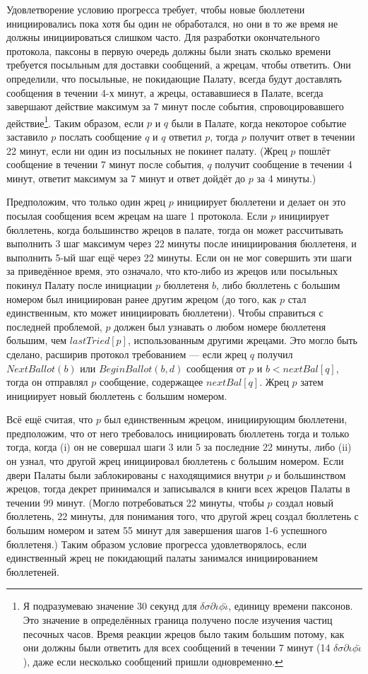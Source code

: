 \documentclass[12pt, a4paper]{article} %
\begin{document}
Удовлетворение условию прогресса требует, чтобы новые бюллетени инициировались пока хотя бы один не обработался, но они в то же время не должны инициироваться слишком часто. Для разработки окончательного протокола, паксоны в первую очередь должны были знать сколько времени требуется посыльным для доставки сообщений, а жрецам, чтобы ответить. Они определили, что посыльные, не покидающие Палату, всегда будут доставлять сообщения в течении 4-х минут, а жрецы, остававшиеся в Палате, всегда завершают действие максимум за 7 минут после события, спровоцировавшего действие\footnote{Я подразумеваю значение 30 секунд для $\delta\sigma\partial\iota\phi\check{\iota}$, единицу времени паксонов. Это значение в определённых граница получено после изучения частиц песочных часов. Время реакции жрецов было таким большим потому, как они должны были ответить для всех сообщений в течении 7 минут (14 $\delta\sigma\partial\iota\phi\check{\iota}$), даже если несколько сообщений пришли одновременно.}. Таким образом, если $p$ и $q$ были в Палате, когда некоторое событие заставило $p$ послать сообщение $q$ и $q$ ответил $p$, тогда $p$ получит ответ в течении 22 минут, если ни один из посыльных не покинет палату. (Жрец $p$ пошлёт сообщение в течении 7 минут после события, $q$ получит сообщение в течении 4 минут, ответит максимум за 7 минут и ответ дойдёт до $p$ за 4 минуты.)

Предположим, что только один жрец $p$ инициирует бюллетени и делает он это посылая сообщения всем жрецам на шаге 1 протокола. Если $p$ инициирует бюллетень, когда большинство жрецов в палате, тогда он может рассчитывать выполнить 3 шаг максимум через 22 минуты после инициирования бюллетеня, и выполнить 5-ый шаг ещё через 22 минуты. Если он не мог совершить эти шаги за приведённое время, это означало, что кто-либо из жрецов или посыльных покинул Палату после инициации $p$ бюллетеня $b$, либо бюллетень с большим номером был инициирован ранее другим жрецом (до того, как $p$ стал единственным, кто может инициировать бюллетени). Чтобы справиться с последней проблемой, $p$ должен был узнавать о любом номере бюллетеня большим, чем $lastTried[p]$, использованным другими жрецами. Это могло быть сделано, расширив протокол требованием --- если жрец $q$ получил $NextBallot(b)$ или $BeginBallot(b, d)$ сообщения от $p$ и $b < nextBal[q]$, тогда он отправлял $p$ сообщение, содержащее $nextBal[q]$. Жрец $p$ затем инициирует новый бюллетень с большим номером.

Всё ещё считая, что $p$ был единственным жрецом, инициирующим бюллетени, предположим, что от него требовалось инициировать бюллетень тогда и только тогда, когда (i) он не совершал шаги 3 или 5 за последние 22 минуты, либо (ii) он узнал, что другой жрец инициировал бюллетень с большим номером. Если двери Палаты были заблокированы с находящимися внутри $p$ и большинством жрецов, тогда декрет принимался и записывался в книги всех жрецов Палаты в течении 99 минут. (Могло потребоваться 22 минуты, чтобы $p$ создал новый бюллетень, 22 минуты, для понимания того, что другой жрец создал бюллетень с большим номером и затем 55 минут для завершения шагов 1-6 успешного бюллетеня.) Таким образом условие прогресса удовлетворялось, если единственный жрец не покидающий палаты занимался инициированием бюллетеней.
\end{document}
